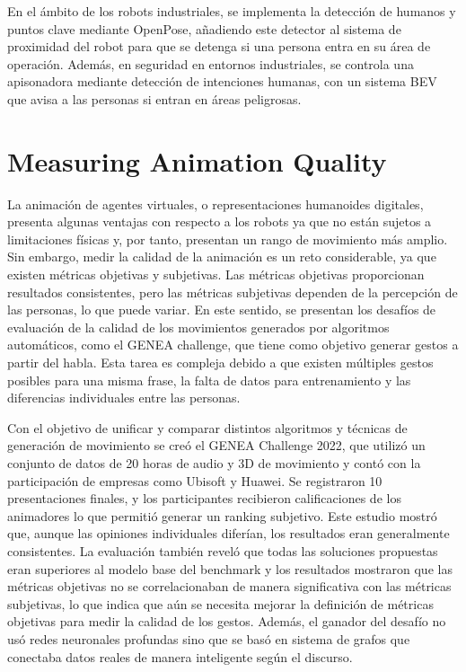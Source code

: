 En el ámbito de los robots industriales, se implementa la detección de humanos y puntos clave mediante OpenPose, añadiendo este detector al sistema de proximidad del robot para que se detenga si una persona entra en su área de operación. Además, en seguridad en entornos industriales, se controla una apisonadora mediante detección de intenciones humanas, con un sistema BEV que avisa a las personas si entran en áreas peligrosas.
\newpage

\section{Measuring Animation Quality}
La animación de agentes virtuales, o representaciones humanoides digitales, presenta algunas ventajas con respecto a los robots ya que no están sujetos a limitaciones físicas y, por tanto, presentan un rango de movimiento más amplio. Sin embargo, medir la calidad de la animación es un reto considerable, ya que existen métricas objetivas y subjetivas. Las métricas objetivas proporcionan resultados consistentes, pero las métricas subjetivas dependen de la percepción de las personas, lo que puede variar. En este sentido, se presentan los desafíos de evaluación de la calidad de los movimientos generados por algoritmos automáticos, como el GENEA challenge, que tiene como objetivo generar gestos a partir del habla. Esta tarea es compleja debido a que existen múltiples gestos posibles para una misma frase, la falta de datos para entrenamiento y las diferencias individuales entre las personas.

Con el objetivo de unificar y comparar distintos algoritmos y técnicas de generación de movimiento se creó el GENEA Challenge 2022, que utilizó un conjunto de datos de 20 horas de audio y 3D de movimiento y contó con la participación de empresas como Ubisoft y Huawei. Se registraron 10 presentaciones finales, y los participantes recibieron calificaciones de los animadores lo que permitió generar un ranking subjetivo. Este estudio mostró que, aunque las opiniones individuales diferían, los resultados eran generalmente consistentes. La evaluación también reveló que todas las soluciones propuestas eran superiores al modelo base del benchmark y los resultados mostraron que las métricas objetivas no se correlacionaban de manera significativa con las métricas subjetivas, lo que indica que aún se necesita mejorar la definición de métricas objetivas para medir la calidad de los gestos. Además, el ganador del desafío no usó redes neuronales profundas sino que se basó en sistema de grafos que conectaba datos reales de manera inteligente según el discurso.

